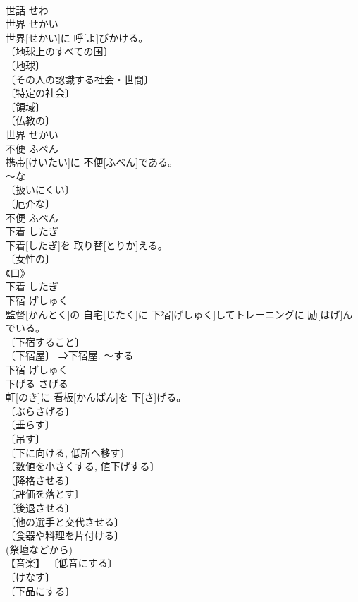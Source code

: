 \documentclass[8pt]{extreport}
\begin{document}
\begin{CJK}{UTF8}{min}
\\	世話	せわ	
\\	世界	せかい	
\\	世界[せかい]に 呼[よ]びかける。	
\\	〔地球上のすべての国〕 
\\	〔地球〕 
\\	〔その人の認識する社会・世間〕 
\\	〔特定の社会〕 
\\	〔領域〕 
\\	〔仏教の〕 
\\	世界	せかい	
\\	不便	ふべん	
\\	携帯[けいたい]に 不便[ふべん]である。	
\\	～な 
\\	〔扱いにくい〕 
\\	〔厄介な〕 
\\	不便	ふべん	
\\	下着	したぎ	
\\	下着[したぎ]を 取り替[とりか]える。	
\\	〔女性の〕 
\\	《口》 
\\	下着	したぎ	
\\	下宿	げしゅく	
\\	監督[かんとく]の 自宅[じたく]に 下宿[げしゅく]してトレーニングに 励[はげ]んでいる。	
\\	〔下宿すること〕 
\\	〔下宿屋〕 ⇒下宿屋. ～する 
\\	下宿	げしゅく	
\\	下げる	さげる	
\\	軒[のき]に 看板[かんばん]を 下[さ]げる。	
\\	〔ぶらさげる〕 
\\	〔垂らす〕 
\\	〔吊す〕 
\\	〔下に向ける, 低所へ移す〕 
\\	〔数値を小さくする, 値下げする〕 
\\	〔降格させる〕 
\\	〔評価を落とす〕 
\\	〔後退させる〕 
\\	〔他の選手と交代させる〕 
\\	〔食器や料理を片付ける〕 
\\	(祭壇などから) 
\\	【音楽】 〔低音にする〕 
\\	〔けなす〕 
\\	〔下品にする〕 

\end{CJK}
\end{document}
